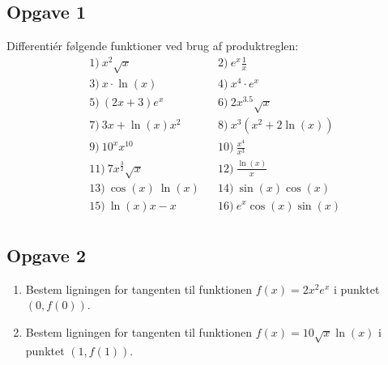 \subsection*{Opgave 1}
Differentiér følgende funktioner ved brug af produktreglen:
\begin{align*}
&1) \   x^2\sqrt{x}   &&2) \  e^x\frac{1}{x}     \\
&3) \  x\cdot \ln(x)  &&4) \  x^4\cdot e^x	\\
&5) \   (2x+3)e^x  &&6) \   2x^{3.5}\sqrt{x}    \\
&7) \  3x + \ln(x)x^2    &&8) \ x^3(x^2+2\ln(x))      \\
&9) \  10^xx^{10}    &&10) \  \frac{x^4}{x^3}     \\
&11) \   7x^{\frac{3}{2}}\sqrt{x}   &&12) \     \frac{\ln(x)}{x}   \\
&13) \ \cos(x)\ \ln(x) &&14) \ \sin(x)\cos(x)  \\
&15) \ \ln(x)x - x  &&16) \ e^x\cos(x) \sin(x)  \\
\end{align*}
\subsection*{Opgave 2}
\begin{enumerate}[label=\roman*)]
\item Bestem ligningen for tangenten til funktionen $f(x)=2x^2e^x$ i punktet $(0,f(0))$.
\item Bestem ligningen for tangenten til funktionen $f(x) = 10\sqrt{x}\ln(x)$ i punktet $(1,f(1))$.
\end{enumerate}
